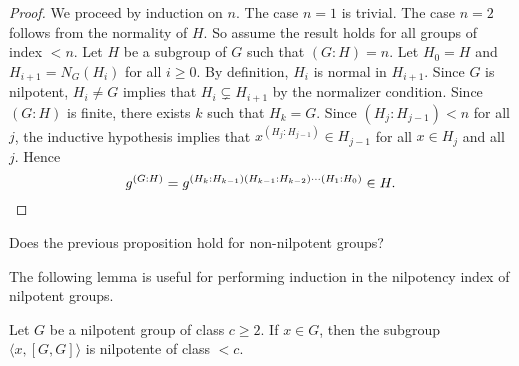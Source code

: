 \begin{proof}
We proceed by induction on $n$. The case $n=1$ is trivial. The case  
$n=2$ follows from the normality of  $H$. So assume the result 
holds for all groups of index $<n$. Let $H$ be a subgroup of $G$ such that $(G:H)=n$. 
Let $H_0=H$ and $H_{i+1}=N_G(H_i)$ for all $i\geq0$. By definition, $H_{i}$ is normal in 
$H_{i+1}$. Since $G$ is nilpotent, $H_i\ne G$
implies that $H_i\subsetneq H_{i+1}$ by the normalizer condition. 
Since $(G:H)$ is finite, there exists $k$ such that  $H_k=G$. Since
$(H_j:H_{j-1})<n$ for all $j$, the inductive hypothesis implies that 
	$x^{(H_j:H_{j-1})}\in H_{j-1}$ for all $x\in H_j$ and all $j$. Hence 
	\[
		g^{(G:H)}=g^{(H_k:H_{k-1})(H_{k-1}:H_{k-2})\cdots (H_1:H_0)}\in H.\qedhere 
	\]
\end{proof}

\begin{exercise}
\label{xca:g^n}
    Does the previous proposition hold for non-nilpotent groups? 
\end{exercise}


The following lemma is useful for performing induction 
in the nilpotency index of nilpotent groups. 

\begin{lemma}
\label{lem:a[GG]}
Let $G$ be a nilpotent group of class $c\geq2$. If $x\in G$, then 
the subgroup 
$\langle x,[G,G]\rangle$ is nilpotente of class $<c$.
\end{lemma}


